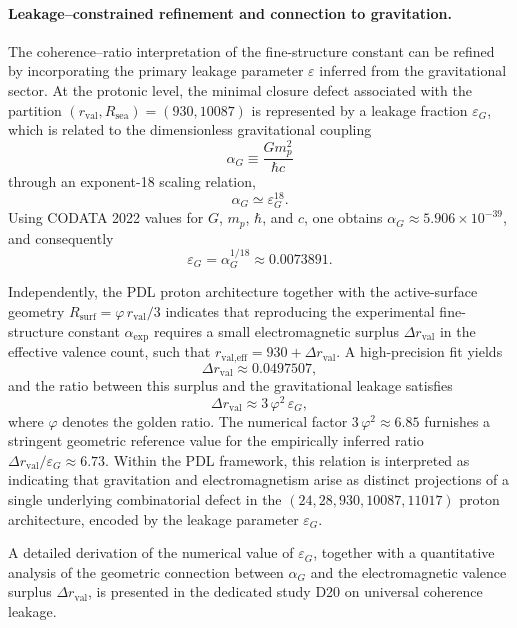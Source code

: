 \documentclass[11pt,a4paper]{article}
\begin{document}
\paragraph{Leakage–constrained refinement and connection to gravitation.}

The coherence–ratio interpretation of the fine-structure constant can be refined by incorporating the primary leakage parameter $\varepsilon$ inferred from the gravitational sector.\cite{Universal_Coherence_Leakage_V3_2026}
At the protonic level, the minimal closure defect associated with the partition $(r_{\text{val}},R_{\text{sea}})=(930,10087)$ is represented by a leakage fraction $\varepsilon_G$, which is related to the dimensionless gravitational coupling
\[
\alpha_G \equiv \frac{G m_p^2}{\hbar c}
\]
through an exponent-18 scaling relation,
\[
\alpha_G \simeq \varepsilon_G^{18}.
\]
Using CODATA 2022 values for $G$, $m_p$, $\hbar$, and $c$, one obtains
$\alpha_G \approx 5.906\times 10^{-39}$, and consequently
\[
\varepsilon_G = \alpha_G^{1/18} \approx 0.0073891.
\]

Independently, the PDL proton architecture together with the active-surface geometry
$R_{\text{surf}} = \varphi\, r_{\text{val}}/3$ indicates that reproducing the experimental fine-structure constant
$\alpha_{\text{exp}}$ requires a small electromagnetic surplus
$\Delta r_{\text{val}}$ in the effective valence count, such that $r_{\text{val,eff}} = 930 + \Delta r_{\text{val}}$.\cite{Alpha_PDL_v2_2026,Universal_Coherence_Leakage_V3_2026}
A high-precision fit yields
\[
\Delta r_{\text{val}} \approx 0.0497507,
\]
and the ratio between this surplus and the gravitational leakage satisfies
\[
\Delta r_{\text{val}} \approx 3\,\varphi^2\,\varepsilon_G,
\]
where $\varphi$ denotes the golden ratio. The numerical factor
$3\,\varphi^2 \approx 6.85$ furnishes a stringent geometric reference value for the empirically inferred ratio $\Delta r_{\text{val}} / \varepsilon_G \approx 6.73$.
Within the PDL framework, this relation is interpreted as indicating that gravitation and electromagnetism arise as distinct projections of a single underlying combinatorial defect in the $(24,28,930,10087,11017)$ proton architecture, encoded by the leakage parameter $\varepsilon_G$.

A detailed derivation of the numerical value of $\varepsilon_G$, together with a quantitative analysis of the geometric connection between $\alpha_G$ and the electromagnetic valence surplus $\Delta r_{\mathrm{val}}$, is presented in the dedicated study D20 on universal coherence leakage.\citep{Universal_Coherence_Leakage_V3_2026}
\end{document}
